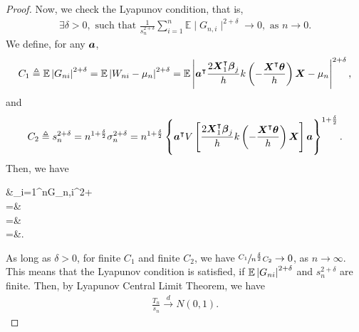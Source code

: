 \begin{proof}
	Now, we check the Lyapunov condition, that is,~\cite{Lindsay1995,Hunter2014}
	\begin{gather*}
	\exists\delta>0, \text{ such that } \frac{1}{s_{n}^{2+\delta}}\sum_{i=1}^{n}\mathbb{E}\mid G_{n,i}\mid^{2+\delta}\to0, \text{ as } n\to0. 
	\end{gather*}
	We define, for any $\boldsymbol{a}$, 
	\begin{gather*}
	C_1 \triangleq \mathbb{E}\left|G_{ni}\right|^{2+\delta}=\mathbb{E}\left|W_{ni}-\mu_{n}\right|^{2+\delta}=\mathbb{E}\left|\boldsymbol{a}^{\intercal}\frac{2\boldsymbol{X}_{1}^{\intercal}\boldsymbol{\beta}_j}{h}k\left(-\frac{\boldsymbol{X}^{\intercal}\boldsymbol{\theta}}{h}\right)\boldsymbol{X}-\mu_{n}\right|^{2+\delta},
	\end{gather*}
	and 
	\begin{gather*}
	C_2 \triangleq s_{n}^{2+\delta}=n^{1+\frac{\delta}{2}}\sigma_{n}^{2+\delta}=n^{1+\frac{\delta}{2}}\left\{ \boldsymbol{\boldsymbol{a}^{\intercal}}V\left[\frac{2\boldsymbol{X}^{\intercal}_{1}\boldsymbol{\beta}_j}{h}k\left(-\frac{\boldsymbol{X}^{\intercal}\boldsymbol{\theta}}{h}\right)\boldsymbol{X}\right]\boldsymbol{a}\right\} ^{1+\frac{\delta}{2}}.
	\end{gather*}
	Then, we have
	\begin{flalign*}
	&\sum_{i=1}^{n}\mid G_{n,i}\mid^{2+\delta}\\
	=&\\
	=& \\
	=&.
	\end{flalign*}
	
	As long as $\delta>0$, for finite $C_1$ and finite $C_2$, we have $\sfrac{C_{1}}{n^{\frac{\delta}{2}}C_{2}}\to0$,
	as $n\to\infty$. This means that the Lyapunov condition is satisfied, if $\mathbb{E}\left|G_{ni}\right|^{2+\delta}$ and $s_{n}^{2+\delta}$ are finite. Then,  by Lyapunov Central Limit Theorem, we have
	\begin{gather*}
	\frac{T_{n}}{s_{n}}\overset{d}{\to}N(0,1).
	\end{gather*}
	

\end{proof}
